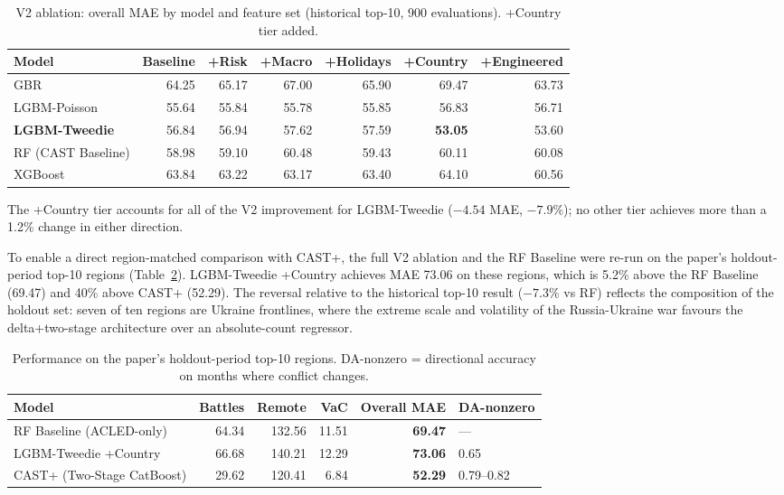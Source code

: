 \documentclass[12pt,a4paper]{article}
\begin{document}
\begin{table}[h]
\centering
\caption{V2 ablation: overall MAE by model and feature set
(historical top-10, 900 evaluations). +Country tier added.}
\label{tab:v2_ablation}
\begin{tabular}{lrrrrrr}
\toprule
\textbf{Model} & \textbf{Baseline} & \textbf{+Risk} & \textbf{+Macro} & \textbf{+Holidays} & \textbf{+Country} & \textbf{+Engineered} \\
\midrule
GBR                   & 64.25 & 65.17 & 67.00 & 65.90 & 69.47          & 63.73 \\
LGBM-Poisson          & 55.64 & 55.84 & 55.78 & 55.85 & 56.83          & 56.71 \\
\textbf{LGBM-Tweedie} & 56.84 & 56.94 & 57.62 & 57.59 & \textbf{53.05} & 53.60 \\
RF (CAST Baseline)    & 58.98 & 59.10 & 60.48 & 59.43 & 60.11          & 60.08 \\
XGBoost               & 63.84 & 63.22 & 63.17 & 63.40 & 64.10          & 60.56 \\
\bottomrule
\end{tabular}
\end{table}

The +Country tier accounts for all of the V2 improvement for
LGBM-Tweedie ($-4.54$ MAE, $-7.9\%$); no other tier achieves more
than a 1.2\% change in either direction.

To enable a direct region-matched comparison with CAST+, the full
V2 ablation and the RF Baseline were re-run on the paper's
holdout-period top-10 regions (Table~\ref{tab:paper_top10_lgbm}).
LGBM-Tweedie +Country achieves MAE 73.06 on these regions, which is
5.2\% above the RF Baseline (69.47) and 40\% above CAST+ (52.29).
The reversal relative to the historical top-10 result ($-7.3\%$
vs RF) reflects the composition of the holdout set: seven of ten
regions are Ukraine frontlines, where the extreme scale and
volatility of the Russia-Ukraine war favours the delta+two-stage
architecture over an absolute-count regressor.

\begin{table}[h]
\centering
\caption{Performance on the paper's holdout-period top-10 regions.
DA-nonzero = directional accuracy on months where conflict changes.}
\label{tab:paper_top10_lgbm}
\begin{tabular}{lrrrrl}
\toprule
\textbf{Model} & \textbf{Battles} & \textbf{Remote} & \textbf{VaC} & \textbf{Overall MAE} & \textbf{DA-nonzero} \\
\midrule
RF Baseline (ACLED-only)   & 64.34 & 132.56 & 11.51 & \textbf{69.47} & --- \\
LGBM-Tweedie +Country      & 66.68 & 140.21 & 12.29 & \textbf{73.06} & 0.65 \\
CAST+ (Two-Stage CatBoost) & 29.62 & 120.41 &  6.84 & \textbf{52.29} & 0.79--0.82 \\
\bottomrule
\end{tabular}
\end{table}
\end{document}
